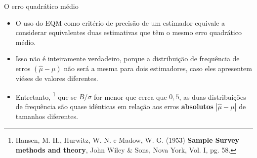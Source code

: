 \documentclass[
  10pt,
  ignorenonframetext,
]{beamer}
\providecommand{\tightlist}{%
  \setlength{\itemsep}{0pt}\setlength{\parskip}{0pt}}
\begin{document}
\begin{frame}[allowframebreaks]{O erro quadrático médio}
\framebreak

\begin{itemize}
\tightlist
\item
  O uso do EQM como critério de precisão de um estimador equivale a
  considerar equivalentes duas estimativas que têm o mesmo erro
  quadrático médio.
\item
  Isso não é inteiramente verdadeiro, porque a distribuição de
  frequência de erros \((\hat{\mu} - \mu)\) não será a mesma para dois
  estimadores, caso eles apresentem viéses de valores diferentes.
\item
  Entretanto,
  \footnote{Hansen, M. H., Hurwitz, W. N. e Madow, W. G. (1953) {\bf Sample Survey methods and theory}, John Wiley \& Sons, Nova York, Vol. I, pg. 58.}
  que se \(B/\sigma\) for menor que cerca que \(0,5\), as duas
  distribuições de frequência são quase idênticas em relação aos erros
  \textbf{absolutos} \(|\hat{\mu} - \mu|\) de tamanhos diferentes.
\end{itemize}
\end{frame}
\end{document}
